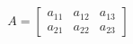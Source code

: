 \documentclass[preview]{standalone}
\begin{document}
\begin{align*}
A = \begin{bmatrix} a_{11} & a_{12} & a_{13} \\ a_{21} & a_{22} & a_{23} \end{bmatrix}
\end{align*}
\end{document}
